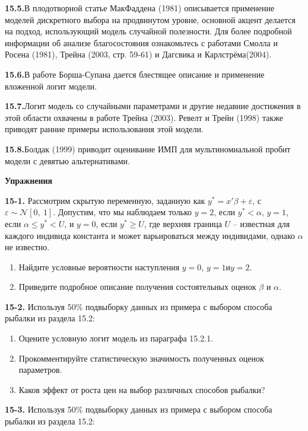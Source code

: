 \textbf{15.5.}В плодотворной статье МакФаддена (1981) описывается применение моделей дискретного выбора на продвинутом уровне, основной акцент делается на подход, использующий модель случайной полезности. Для более подробной информации об анализе благосостояния ознакомьтесь с работами Смолла и Росена (1981), Трейна (2003, стр. 59-61) и Дагсвика и Карлстрёма(2004).

\textbf{15.6.}В работе Борша-Супана дается блестящее описание и применение вложенной логит модели.

\textbf{15.7.}Логит модель со случайными параметрами и другие недавние достижения в этой области охвачены в работе Трейна (2003). Ревелт и Трейн (1998) также приводят ранние примеры использования этой модели.

\textbf{15.8.}Болдак (1999) приводит оценивание ИМП для мультиномиальной пробит модели с девятью альтернативами.

\textbf{Упражнения}

\textbf{15-1. }Рассмотрим скрытую переменную, заданную как $y^*=x'\beta +\varepsilon $, с $\varepsilon \sim {\mathcal N}[0,\ 1]$. Допустим, что мы наблюдаем только $y=2$, если $y^*<\alpha $, $y=1$, если $\alpha \le y^*<U$, и $y=0$, если $y^*\ge U$, где верхняя граница $U$ -- известная для каждого индивида константа и может варьироваться между индивидами, однако $\alpha $ не известно.

\begin{enumerate}
\item  Найдите условные вероятности наступления $y=0$, $y=1$и$y=2$.

\item  Приведите подробное описание получения состоятельных оценок $\beta $ и $\alpha $.
\end{enumerate}

\textbf{15-2. }Используя 50\% подвыборку данных из примера с выбором способа рыбалки из раздела 15.2:

\begin{enumerate}
\item  Оцените условную логит модель из параграфа 15.2.1.

\item  Прокомментируйте статистическую значимость полученных оценок параметров.

\item  Каков эффект от роста цен на выбор различных способов рыбалки?
\end{enumerate}

\textbf{15-3. }Используя 50\% подвыборку данных из примера с выбором способа рыбалки из раздела 15.2:


